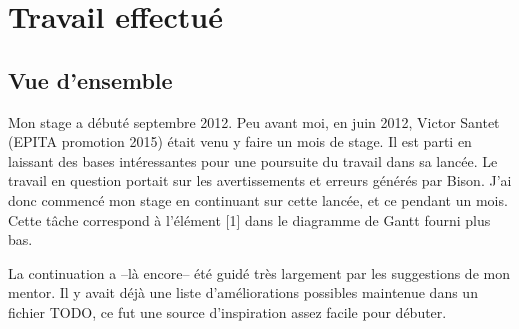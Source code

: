 \documentclass[a4paper,11pt,twoside,final]{article}
\begin{document}







  \cleardoublepage

  \section{Travail effectué}

  \subsection{Vue d'ensemble}

  Mon stage a débuté septembre 2012. Peu avant moi, en juin 2012, Victor
  Santet (EPITA promotion 2015) était venu y faire un mois de stage. Il est
  parti en laissant des bases intéressantes pour une poursuite du travail dans
  sa lancée. Le travail en question portait sur les avertissements et erreurs
  générés par Bison. J'ai donc commencé mon stage en continuant sur cette
  lancée, et ce pendant un mois. Cette tâche correspond à l'élément [1] dans le
  diagramme de Gantt fourni plus bas.


  La continuation a --là encore-- été guidé très largement par les suggestions
  de mon mentor.  Il y avait déjà une liste d'améliorations possibles maintenue
  dans un fichier TODO, ce fut une source d'inspiration assez facile pour
  débuter.
\end{document}
